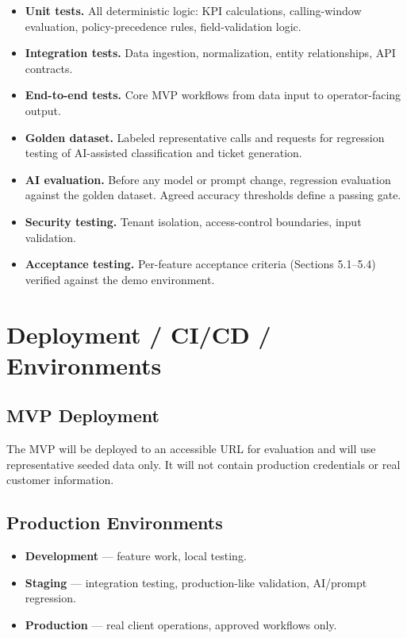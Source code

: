 \documentclass[11pt,a4paper]{article}
\begin{document}
\begin{itemize}
  \item \textbf{Unit tests.} All deterministic logic: KPI calculations, calling-window evaluation, policy-precedence rules, field-validation logic.
  \item \textbf{Integration tests.} Data ingestion, normalization, entity relationships, API contracts.
  \item \textbf{End-to-end tests.} Core MVP workflows from data input to operator-facing output.
  \item \textbf{Golden dataset.} Labeled representative calls and requests for regression testing of AI-assisted classification and ticket generation.
  \item \textbf{AI evaluation.} Before any model or prompt change, regression evaluation against the golden dataset. Agreed accuracy thresholds define a passing gate.
  \item \textbf{Security testing.} Tenant isolation, access-control boundaries, input validation.
  \item \textbf{Acceptance testing.} Per-feature acceptance criteria (Sections 5.1–5.4) verified against the demo environment.
\end{itemize}

\section{Deployment / CI/CD / Environments}

\subsection{MVP Deployment}

The MVP will be deployed to an accessible URL for evaluation and will use representative seeded data only. It will not contain production credentials or real customer information.

\subsection{Production Environments}

\begin{itemize}
  \item \textbf{Development} — feature work, local testing.
  \item \textbf{Staging} — integration testing, production-like validation, AI/prompt regression.
  \item \textbf{Production} — real client operations, approved workflows only.
\end{itemize}
\end{document}
